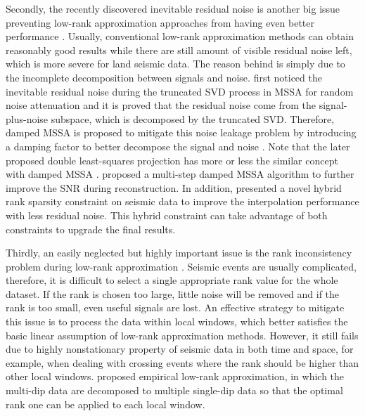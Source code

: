 Secondly, the recently discovered inevitable residual noise is another big issue preventing low-rank approximation approaches from having even better performance \cite{gavish2014optimal,trickett2015preserving,aharchaou2017singular,yatong2018gji}. Usually, conventional low-rank approximation methods can obtain reasonably good results while there are still amount of visible residual noise left, which is more severe for land seismic data. The reason behind is simply due to the incomplete decomposition between signals and noise. \cite{weilin2016} first noticed the inevitable residual noise during the truncated SVD process in MSSA for random noise attenuation and it is proved that the residual noise come from the signal-plus-noise subspace, which is decomposed by the truncated SVD. Therefore, damped MSSA is proposed to mitigate this noise leakage problem by introducing a damping factor to better decompose the signal and noise \cite{weilin2016}. Note that the later proposed double least-squares projection has more or less the similar concept with damped MSSA \cite{weilingieeedls}. \cite{dong} proposed a multi-step damped MSSA algorithm to further improve the SNR during reconstruction.  In addition, \cite{dong2017} presented a novel hybrid rank sparsity constraint on seismic data to improve the interpolation performance with less residual noise. This hybrid constraint can take advantage of both constraints to upgrade the final results.  

Thirdly, an easily neglected but highly important issue is the rank inconsistency problem during low-rank approximation \cite{yangkangelra,shaohuan2017gji,baimin2018cg}. Seismic events are usually complicated, therefore, it is difficult to select a single appropriate rank value for the whole dataset. If the rank is chosen too large, little noise will be removed and if the rank is too small, even useful signals are lost. An effective strategy to mitigate this issue is to process the data within local windows, which better satisfies the basic linear assumption of low-rank approximation methods. However, it still fails due to highly nonstationary property of seismic data in both time and space, for example, when dealing with crossing events where the rank should be higher than other local windows. \cite{yangkangelra} proposed empirical low-rank approximation, in which the multi-dip data are decomposed to multiple single-dip data so that the optimal rank one can be applied to each local window. 

